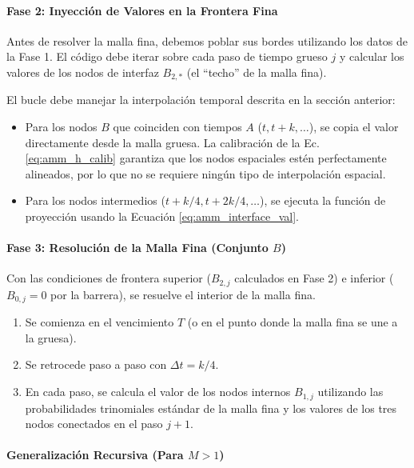 \paragraph{Fase 2: Inyección de Valores en la Frontera Fina} 

Antes de resolver la malla fina, debemos poblar sus bordes utilizando los datos de la Fase 1. El código debe iterar sobre cada paso de tiempo grueso $j$ y calcular los valores de los nodos de interfaz $B_{2,*}$ (el ``techo'' de la malla fina).

El bucle debe manejar la interpolación temporal descrita en la sección anterior: 
\begin{itemize} 
  \item Para los nodos $B$ que coinciden con tiempos $A$ ($t,t+k,\dots$), se copia el valor directamente desde la malla gruesa. La calibración de la Ec. \ref{eq:amm_h_calib} garantiza que los nodos espaciales estén perfectamente alineados, por lo que no se requiere ningún tipo de interpolación espacial. 
  
  \item Para los nodos intermedios ($t+k/4,t+2k/4,\dots$), se ejecuta la función de proyección usando la Ecuación \ref{eq:amm_interface_val}. 
\end{itemize}

\paragraph{Fase 3: Resolución de la Malla Fina (Conjunto $B$)} 

Con las condiciones de frontera superior ($B_{2,j}$ calculados en Fase 2) e inferior ($B_{0,j}=0$ por la barrera), se resuelve el interior de la malla fina. 

\begin{enumerate} 
  \item Se comienza en el vencimiento $T$ (o en el punto donde la malla fina se une a la gruesa). 
  
  \item Se retrocede paso a paso con $\Delta t=k/4$. 
  
  \item En cada paso, se calcula el valor de los nodos internos $B_{1,j}$ utilizando las probabilidades trinomiales estándar de la malla fina y los valores de los tres nodos conectados en el paso $j+1$. 
\end{enumerate}

\paragraph{Generalización Recursiva (Para $M>1$)} 


